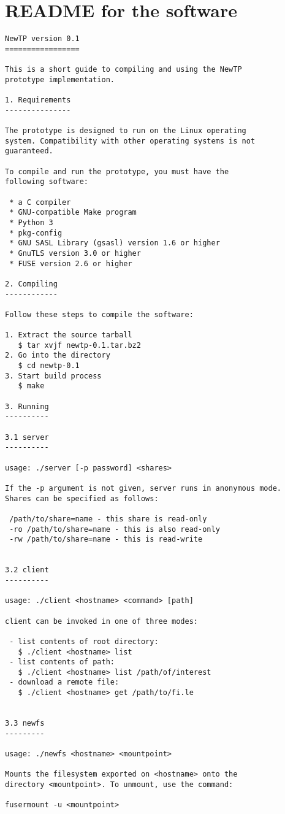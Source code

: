 \chapter{README for the software}
\begin{verbatim}
NewTP version 0.1
=================

This is a short guide to compiling and using the NewTP
prototype implementation.

1. Requirements
---------------

The prototype is designed to run on the Linux operating
system. Compatibility with other operating systems is not
guaranteed.

To compile and run the prototype, you must have the
following software:

 * a C compiler
 * GNU-compatible Make program
 * Python 3
 * pkg-config
 * GNU SASL Library (gsasl) version 1.6 or higher
 * GnuTLS version 3.0 or higher
 * FUSE version 2.6 or higher

2. Compiling
------------

Follow these steps to compile the software:

1. Extract the source tarball
   $ tar xvjf newtp-0.1.tar.bz2
2. Go into the directory
   $ cd newtp-0.1
3. Start build process
   $ make

3. Running
----------

3.1 server
----------

usage: ./server [-p password] <shares>

If the -p argument is not given, server runs in anonymous mode.
Shares can be specified as follows:

 /path/to/share=name - this share is read-only
 -ro /path/to/share=name - this is also read-only
 -rw /path/to/share=name - this is read-write


3.2 client
----------

usage: ./client <hostname> <command> [path]

client can be invoked in one of three modes:

 - list contents of root directory:
   $ ./client <hostname> list
 - list contents of path:
   $ ./client <hostname> list /path/of/interest
 - download a remote file:
   $ ./client <hostname> get /path/to/fi.le


3.3 newfs
---------

usage: ./newfs <hostname> <mountpoint>

Mounts the filesystem exported on <hostname> onto the
directory <mountpoint>. To unmount, use the command:

fusermount -u <mountpoint>


\end{verbatim}
